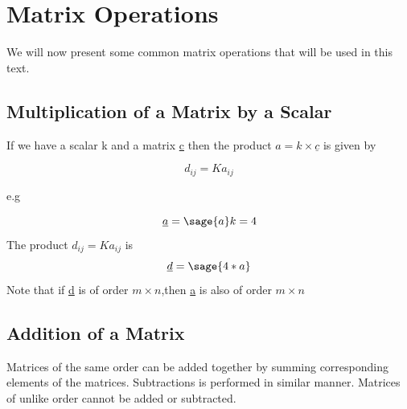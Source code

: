 \documentclass[12pt]{report}
\begin{document}
\section{Matrix Operations}

We will now present some common matrix operations that will be used in this text.

\subsection{Multiplication of a Matrix by a Scalar}

If we have a scalar k and a matrix \underline{c}
then the product $a = k \times \underline{c} $ is given by

\begin{equation}d_{{ij}} = Ka_{{ij}}
	\label{eq:element}
\end{equation}

e.g

$$\underline{a}=\sage{a}
	k= 4 $$
The product 
$d_{{ij}} = Ka_{{ij}}$ is 
$$\underline{d} = \sage{4*a}$$
Note that if \underline{d} is of order
$ m \times n $,then \underline{a} is 
also of order $ m \times n $


\subsection{Addition of a Matrix}

Matrices of the same order can be added
together by summing corresponding elements
of the matrices. Subtractions is performed 
in similar manner. Matrices of unlike order
cannot be added or subtracted.
\end{document}
